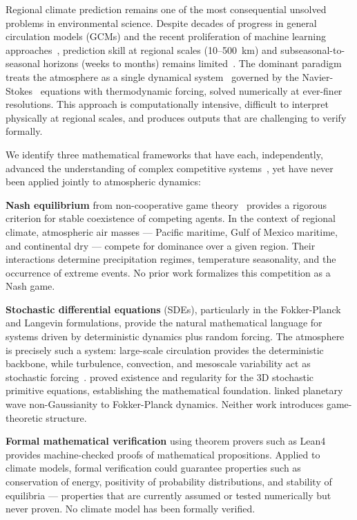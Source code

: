 \documentclass[gmd, manuscript]{copernicus}
\begin{document}
Regional climate prediction remains one of the most consequential
unsolved problems in environmental science. Despite decades of progress
in general circulation models (GCMs) and the recent proliferation of
machine learning approaches~\citep{Schultz2021}, prediction skill at regional scales
(10--500~km) and subseasonal-to-seasonal horizons (weeks to months)
remains limited~\citep{Palmer2019}. The dominant paradigm treats the
atmosphere as a single dynamical system~\citep{Lorenz1963} governed by the Navier-Stokes~\citep{Lorenz1963}
equations with thermodynamic forcing, solved numerically at ever-finer
resolutions. This approach is computationally intensive, difficult to
interpret physically at regional scales, and produces outputs that are
challenging to verify formally.

We identify three mathematical frameworks that have each, independently,
advanced the understanding of complex competitive systems~\citep{Ghil2002}, yet have never
been applied jointly to atmospheric dynamics:

\textbf{Nash equilibrium} from non-cooperative game theory~\citep{Osborne1994, Fudenberg1991} provides a
rigorous criterion for stable coexistence of competing agents. In the
context of regional climate, atmospheric air masses — Pacific maritime,
Gulf of Mexico maritime, and continental dry — compete for dominance
over a given region. Their interactions determine precipitation regimes,
temperature seasonality, and the occurrence of extreme events. No prior
work formalizes this competition as a Nash game.

\textbf{Stochastic differential equations} (SDEs), particularly in the
Fokker-Planck and Langevin formulations, provide the natural mathematical
language for systems driven by deterministic dynamics plus random
forcing. The atmosphere is precisely such a system: large-scale
circulation provides the deterministic backbone, while turbulence,
convection, and mesoscale variability act as stochastic forcing~\citep{Frankignoul2012}.
\citet{Debussche2012} proved existence and regularity for the 3D
stochastic primitive equations, establishing the mathematical foundation.
\citet{Majda2006} linked planetary wave non-Gaussianity to Fokker-Planck
dynamics. Neither work introduces game-theoretic structure.

\textbf{Formal mathematical verification} using theorem provers such as
Lean4~\citep{LeanFour2021, Mathlib2020} provides machine-checked proofs of mathematical
propositions. Applied to climate models, formal verification could
guarantee properties such as conservation of energy, positivity of
probability distributions, and stability of equilibria — properties
that are currently assumed or tested numerically but never proven.
No climate model has been formally verified.
\end{document}
